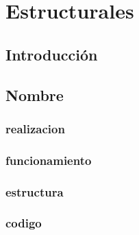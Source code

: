 \chapter{Estructurales}
\section{Introducción}
\newpage
\section{Nombre}
\subsection{realizacion}
\newpage
\subsection{funcionamiento}
\newpage
\subsection{estructura}
\newpage
\subsection{codigo}
\newpage